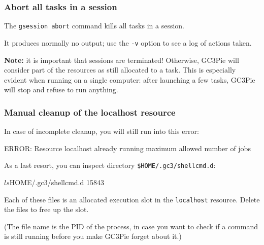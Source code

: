 \documentclass[english,serif,mathserif,xcolor=pdftex,dvipsnames,table]{beamer}
\begin{document}
\begin{frame}[fragile]
  \frametitle{Abort all tasks in a session}

  The \texttt{gsession abort} command kills all tasks in a session.

  \+
  It produces normally no output; use the \texttt{-v} option to see a
  log of actions taken.

  \+ \small \textbf{Note:} it is important that sessions are
  terminated!  Otherwise, GC3Pie will consider part of the resources
  as still allocated to a task.  This is especially evident when
  running on a single computer: after launching a few tasks, GC3Pie
  will stop and refuse to run anything.
\end{frame}


\begin{frame}[fragile]
  \frametitle{Manual cleanup of the {\ttfamily localhost} resource}

  In case of incomplete cleanup, you will still run into this error:
\begin{stdout}
  ERROR: Resource localhost already running maximum allowed number of jobs
\end{stdout}

  \+
  As a last resort, you can inspect directory \lstinline|$HOME/.gc3/shellcmd.d|:
\begin{stdout}
  $ ls $HOME/.gc3/shellcmd.d
  15843
\end{stdout}
  Each of these files is an allocated execution slot in the \texttt{localhost} resource.
  Delete the files to free up the slot.

  \+ (The file name is the PID of the process, in case you want to
  check if a command is still running before you make GC3Pie forget
  about it.)
\end{frame}
\end{document}
